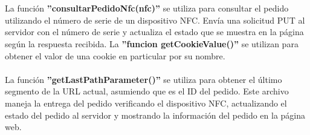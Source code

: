 \documentclass[12pt]{report}
\begin{document}
\\\\
La función \textbf{''consultarPedidoNfc(nfc)''} se utiliza para consultar el pedido utilizando el número de serie de un dispositivo NFC. Envía una solicitud PUT al servidor con el número de serie y actualiza el estado que se muestra en la página según la respuesta recibida. La \textbf{''funcion getCookieValue()''} se utilizan para obtener el valor de una cookie en particular por su nombre.
\\\\
La función \textbf{''getLastPathParameter()''} se utiliza para obtener el último segmento de la URL actual, asumiendo que es el ID del pedido.
Este archivo maneja la entrega del pedido verificando el dispositivo NFC, actualizando el estado del pedido al servidor y mostrando la información del pedido en la página web. 
\end{document}
